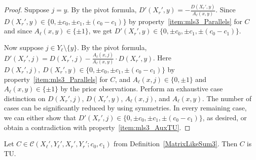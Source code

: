 \begin{proof}
    Suppose $j = y$. By the pivot formula, $D' (X_{r}', y) = -\frac{D (X_{r}', y)}{A_{\ell} (x, y)}$. Since $D (X_{r}', y) \in \{0, \pm c_{0}, \pm c_{1}, \pm (c_{0} - c_{1})\}$ by property~\ref{item:mls3_Parallels} for $C$ and since $A_{\ell} (x, y) \in \{\pm 1\}$, we get $D' (X_{r}', y) \in \{0, \pm c_{0}, \pm c_{1}, \pm (c_{0} - c_{1})\}$.

    Now suppose $j \in Y_{\ell} \setminus \{y\}$. By the pivot formula, $D' (X_{r}', j) = D (X_{r}', j) - \frac{A_{\ell} (x, j)}{A_{\ell} (x, y)} \cdot D (X_{r}', y)$. Here $D (X_{r}', j), \ D (X_{r}', y) \in \{0, \pm c_{0}, \pm c_{1}, \pm (c_{0} - c_{1})\}$ by property~\ref{item:mls3_Parallels} for $C$, and $A_{\ell} (x, j) \in \{0, \pm 1\}$ and $A_{\ell} (x, y) \in \{\pm 1\}$ by the prior observations. Perform an exhaustive case distinction on $D (X_{r}', j)$, $D (X_{r}', y)$, $A_{\ell} (x, j)$, and $A_{\ell} (x, y)$. The number of cases can be significantly reduced by using symmetries. In every remaining case, we can either show that $D' (X_{r}', j) \in \{0, \pm c_{0}, \pm c_{1}, \pm (c_{0} - c_{1})\}$, as desired, or obtain a contradiction with property~\ref{item:mls3_AuxTU}.
\end{proof}

\begin{lemma}
    \label{MatrixLikeSum3.isTotallyUnimodular}
    \leanok
    Let $C \in \mathcal{C} (X_{\ell}', Y_{\ell}', X_{r}', Y_{r}'; c_{0}, c_{1})$ from Definition~\ref{MatrixLikeSum3}. Then $C$ is TU.
\end{lemma}

